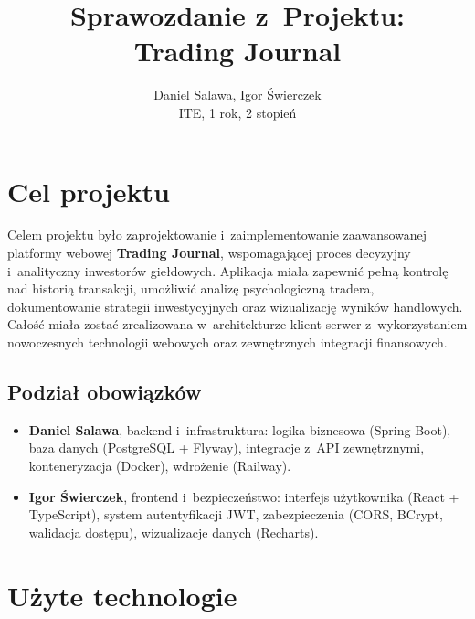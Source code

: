 \documentclass[12pt,a4paper]{article}
\title{\textbf{Sprawozdanie z~Projektu:\\ Trading Journal}}
\author{
  Daniel Salawa, Igor Świerczek \\
  ITE, 1 rok, 2 stopień
}
\date{}
\begin{document}
\maketitle

\section{Cel projektu}

Celem projektu było zaprojektowanie i~zaimplementowanie zaawansowanej platformy webowej \textbf{Trading Journal}, wspomagającej proces decyzyjny i~analityczny inwestorów giełdowych. Aplikacja miała zapewnić pełną kontrolę nad historią transakcji, umożliwić analizę psychologiczną tradera, dokumentowanie strategii inwestycyjnych oraz wizualizację wyników handlowych. Całość miała zostać zrealizowana w~architekturze klient-serwer z~wykorzystaniem nowoczesnych technologii webowych oraz zewnętrznych integracji finansowych.

\subsection*{Podział obowiązków}
\begin{itemize}
  \item \textbf{Daniel Salawa}, backend i~infrastruktura: logika biznesowa (Spring Boot), baza danych (PostgreSQL + Flyway), integracje z~API zewnętrznymi, konteneryzacja (Docker), wdrożenie (Railway).
  \item \textbf{Igor Świerczek}, frontend i~bezpieczeństwo: interfejs użytkownika (React + TypeScript), system autentyfikacji JWT, zabezpieczenia (CORS, BCrypt, walidacja dostępu), wizualizacje danych (Recharts).
\end{itemize}

\section{Użyte technologie}
\end{document}
